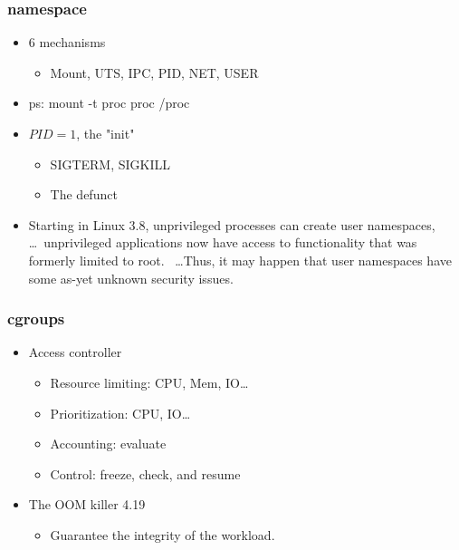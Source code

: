 \documentclass{beamer}
\begin{document}
\begin{frame}
    \frametitle{namespace}
    \begin{itemize}
        \item 6 mechanisms
              \begin{itemize}
                  \item Mount, UTS, IPC, PID, NET, USER
              \end{itemize}
        \item ps: mount -t proc proc /proc
        \item $PID = 1$, the "init"\cite{docker_pid1}
              \begin{itemize}
                  \item SIGTERM, SIGKILL
                  \item The defunct
              \end{itemize}
        \item Starting in Linux 3.8, unprivileged processes can create user namespaces, \dots \
              unprivileged applications now have access to functionality that was formerly limited to root. \
              \dots Thus, it may happen that user namespaces have some as-yet unknown security issues.\cite{lwn_531114}
    \end{itemize}
\end{frame}

\begin{frame}
    \frametitle{cgroups}
    \begin{itemize}
        \item Access controller
              \begin{itemize}
                  \item Resource limiting: CPU, Mem, IO\dots
                  \item Prioritization: CPU, IO\dots
                  \item Accounting: evaluate
                  \item Control: freeze, check, and resume
              \end{itemize}
        \item The OOM killer 4.19
              \begin{itemize}
                  \item Guarantee the integrity of the workload.
              \end{itemize}
    \end{itemize}
\end{frame}
\end{document}
